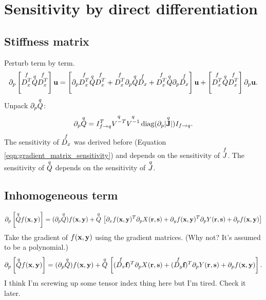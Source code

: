 \section{Sensitivity by direct differentiation}

\subsection{Stiffness matrix}

Perturb term by term.
%
\begin{equation}
\partial_p \left[ \overset{f}{D_x^T} \overset{q}{Q} \overset{f}{D_x^T} \right] \textbf{u} = \left[ \partial_p \overset{f}{D_x^T} \overset{q}{Q} \overset{f}{D_x^T} + \overset{f}{D_x^T} \partial_p \overset{q}{Q} \overset{f}{D_x} + \overset{f}{D_x^T} \overset{q}{Q} \partial_p \overset{f}{D_x} \right] \textbf{u} + \left[ \overset{f}{D_x^T} \overset{q}{Q} \overset{f}{D_x^T} \right] \partial_p \textbf{u}.
\end{equation}
%
Unpack $\partial_p \overset{q}{Q}$:
%
\begin{equation}
\partial_p \overset{q}{Q} = I_{f \rightarrow q}^T \overset{q}{V^{-T}} \overset{q}{V^{-1}} \operatorname{diag}( \partial_p |\overset{q}{\textbf{J}}| ) I_{f \rightarrow q}.
\end{equation}
%
The sensitivity of $\overset{f}{D_x}$ was derived before (Equation \ref{eqn:gradient_matrix_sensitivity}) and depends on the sensitivity of $\overset{f}{J}$.  The sensitivity of $\overset{q}{Q}$ depends on the sensitivity of $\overset{q}{J}$.

\subsection{Inhomogeneous term}

\begin{equation}
\begin{aligned}
\partial_p \left[ \overset{q}{Q} f(\textbf{x}, \textbf{y}) \right] =
(\partial_p \overset{q}{Q}) f(\textbf{x}, \textbf{y})
+ \overset{q}{Q} \,
\left[
\partial_x f(\textbf{x}, \textbf{y})^T \partial_p X(\textbf{r}, \textbf{s})
+ \partial_y f(\textbf{x}, \textbf{y})^T \partial_p Y(\textbf{r}, \textbf{s})
+ \partial_p f(\textbf{x}, \textbf{y})
\right]
\end{aligned}
\end{equation}
%
Take the gradient of $f(\textbf{x}, \textbf{y})$ using the gradient matrices.  (Why not?  It's assumed to be a polynomial.)
%
\begin{equation}
\partial_p \left[ \overset{q}{Q} f(\textbf{x}, \textbf{y}) \right] =
(\partial_p \overset{q}{Q}) f(\textbf{x}, \textbf{y})
+ \overset{q}{Q} \,
\left[
(\overset{f}{D_x} \textbf{f})^T \partial_p X(\textbf{r}, \textbf{s})
+ (\overset{f}{D_y} \textbf{f})^T \partial_p Y(\textbf{r}, \textbf{s})
+ \partial_p f(\textbf{x}, \textbf{y})
\right].
\end{equation}
%
I think I'm screwing up some tensor index thing here but I'm tired.  Check it later.
















